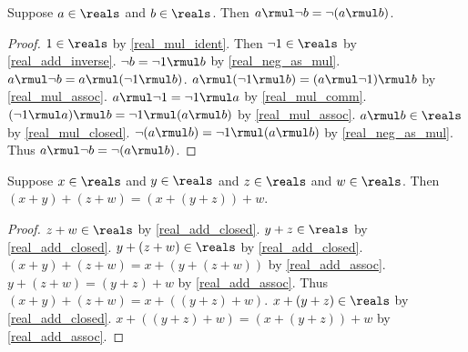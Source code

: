 \begin{lemma}\label{real_mul_neg_right}
    Suppose $a\in\reals$ and $b\in\reals$.
    Then $a \rmul \neg{b} = \neg{(a \rmul b)}$.
\end{lemma}
\begin{proof}
    $1\in\reals$ by \cref{real_mul_ident}.
    Then $\neg{1}\in\reals$ by \cref{real_add_inverse}.
    $\neg{b} = \neg{1} \rmul b$ by \cref{real_neg_as_mul}.
    $a \rmul \neg{b} = a \rmul (\neg{1} \rmul b)$.
    $a \rmul (\neg{1} \rmul b) = (a \rmul \neg{1}) \rmul b$ by \cref{real_mul_assoc}.
    $a \rmul \neg{1} = \neg{1} \rmul a$ by \cref{real_mul_comm}.
    $(\neg{1} \rmul a) \rmul b = \neg{1} \rmul (a \rmul b)$ by \cref{real_mul_assoc}.
    $a \rmul b\in\reals$ by \cref{real_mul_closed}.
    $\neg{(a \rmul b)} = \neg{1} \rmul (a \rmul b)$ by \cref{real_neg_as_mul}.
    Thus $a \rmul \neg{b} = \neg{(a \rmul b)}$.
\end{proof}

\begin{lemma}\label{real_add_regroup}
    Suppose $x\in\reals$ and $y\in\reals$ and $z\in\reals$ and $w\in\reals$.
    Then $(x + y) + (z + w) = (x + (y + z)) + w$.
\end{lemma}
\begin{proof}
    $z + w\in\reals$ by \cref{real_add_closed}.
    $y + z\in\reals$ by \cref{real_add_closed}.
    $y + (z + w)\in\reals$ by \cref{real_add_closed}.
    $(x + y) + (z + w) = x + (y + (z + w))$ by \cref{real_add_assoc}.
    $y + (z + w) = (y + z) + w$ by \cref{real_add_assoc}.
    Thus $(x + y) + (z + w) = x + ((y + z) + w)$.
    $x + (y + z)\in\reals$ by \cref{real_add_closed}.
    $x + ((y + z) + w) = (x + (y + z)) + w$ by \cref{real_add_assoc}.
\end{proof}

